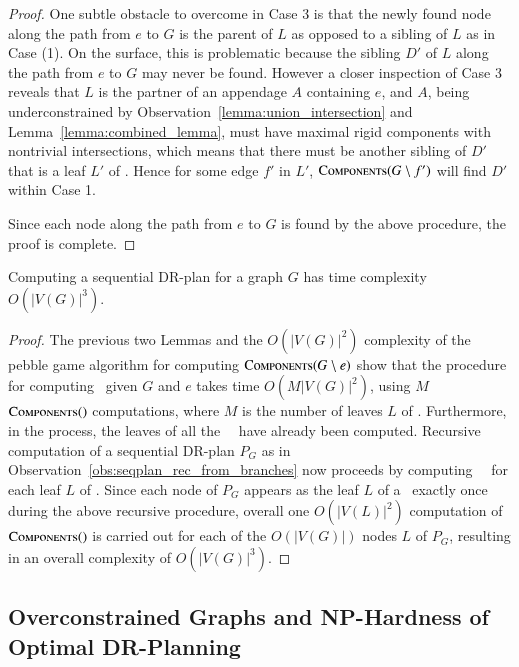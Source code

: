 \begin{proof}
    One subtle obstacle to overcome in Case 3 is that the newly found node along the path from $e$ to $G$ is the parent of $L$ as opposed to a sibling of $L$ as in Case (1). On the surface, this is problematic because the sibling $D'$ of $L$ along the path from $e$ to $G$ may never be found. However a closer inspection of Case 3 reveals that $L$ is the partner of an appendage $A$ containing $e$, and $A$, being underconstrained by Observation~\ref{lemma:union_intersection} and Lemma~\ref{lemma:combined_lemma}, must have maximal rigid components with nontrivial intersections, which means that there must be another sibling of $D'$ that is a leaf $L'$ of \branchGePG. Hence for some edge $f'$ in $L'$, $\textsc{Components}(G\setminus f')$ will find $D'$ within Case 1.

    Since each node along the path from $e$ to $G$ is found by the above procedure, the proof is complete.
\end{proof}




\begin{theorem}
\label{theorem:algo_complexity}
    Computing a sequential DR-plan for a graph $G$ has time complexity $O(|V(G)|^3)$.
\end{theorem}

\begin{proof}
    The previous two Lemmas and the $O(|V(G)|^2)$ complexity of the pebble game algorithm for computing $\textsc{Components}(G\setminus e)$ show that the procedure for computing \branchGePG\ given $G$ and $e$ takes time $O(M|V(G)|^2)$, using $M$ $\textsc{Components}()$ computations, where $M$ is the number of leaves $L$ of \branchGePG. Furthermore, in the process, the leaves of all the \branches\ \branchLfPL\ have already been computed. Recursive computation of a sequential DR-plan $P_G$ as in Observation~\ref{obs:seqplan_rec_from_branches} now proceeds by computing \branches\ \branchLfPL\ for each leaf $L$ of \branchGePG. Since each node of $P_G$ appears as the leaf $L$ of a \branch\ exactly once during the above recursive procedure, overall one $O(|V(L)|^2)$ computation of $\textsc{Components}()$ is carried out for each of the $O(|V(G)|)$ nodes $L$ of $P_G$, resulting in an overall complexity of $O(|V(G)|^3)$.
\end{proof}



\subsection{Overconstrained Graphs and NP-Hardness of Optimal DR-Planning}
\label{sec:drp:overconstrained}



